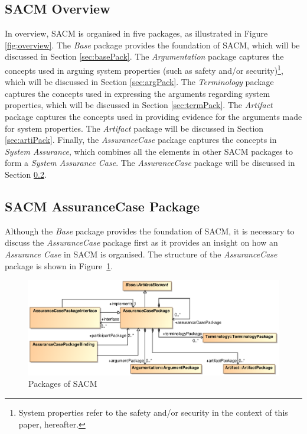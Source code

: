 \subsection{SACM Overview}
In overview, SACM is organised in five packages, as illustrated in Figure \ref{fig:overview}. The \textit{Base} package provides the foundation of SACM, which will be discussed in Section \ref{sec:basePack}. The \textit{Argumentation} package captures the concepts used in arguing system properties (such as safety and/or security)\footnote{System properties refer to the safety and/or security in the context of this paper, hereafter.}, which will be discussed in Section \ref{sec:argPack}. The \textit{Terminology} package captures the concepts used in expressing the arguments regarding system properties, which will be discussed in Section \ref{sec:termPack}. The \textit{Artifact} package captures the concepts used in providing evidence for the arguments made for system properties. The \textit{Artifact} package will be discussed in Section \ref{sec:artiPack}. Finally, the \textit{AssuranceCase} package captures the concepts in \textit{System Assurance}, which combines all the elements in other SACM packages to form a \textit{System Assurance Case}. The \textit{AssuranceCase} package will be discussed in Section \ref{sec:acPack}.

\subsection{SACM AssuranceCase Package}
\label{sec:acPack}
Although the \textit{Base} package provides the foundation of SACM, it is necessary to discuss the \textit{AssuranceCase} package first as it provides an insight on how an \textit{Assurance Case} in SACM is organised. The structure of the \textit{AssuranceCase} package is shown in Figure~\ref{fig:ac}.

\begin{figure}
	\centering
	\includegraphics[width=1\linewidth]{fig/AssuranceCase.eps}
	\caption{Packages of SACM}
	\label{fig:ac}
\end{figure}

